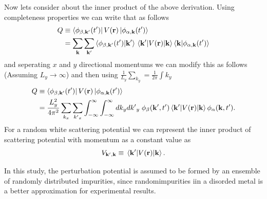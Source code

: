 \noindent
Now lets consider about the inner product of the above derivation. Using completeness properties we can write that as follows
\begin{equation} \label{4.23}
  \begin{aligned}
    Q & \equiv
    \bra{\phi_{\beta,\mathbf{k'}}(t')}
    V(\mathbf{r}) \ket{\phi_{\alpha,\mathbf{k}}(t')} \\
    & =
    \sum_{\mathbf{k}}\sum_{\mathbf{k'}}
    \braket{\phi_{\beta,\mathbf{k'}}(t')}{\mathbf{k'}}
    \mel{\mathbf{k'}}{V(\mathbf{r})}{\mathbf{k}}
    \braket{\mathbf{k}}{\phi_{\alpha,\mathbf{k}}(t')}
  \end{aligned}
\end{equation}
and seperating $x$ and $y$ directional momentums we can modify this as follows (Assuming $L_y \rightarrow \infty$) and then using $\frac{1}{L_y}\sum_{k_y} = \frac{1}{2\pi}\int k_y$
\begin{equation} \label{4.24}
  \begin{aligned}
    Q & \equiv
    \bra{\phi_{\beta,\mathbf{k'}}(t')}
    V(\mathbf{r}) \ket{\phi_{\alpha,\mathbf{k}}(t')} \\
    & =
    \frac{L_y^2}{4 \pi^2}
    \sum_{k_x}\sum_{{k'}_x}
    \int_{-\infty}^{\infty} \int_{-\infty}^{\infty} dk_y d{k'}_y \;
    \phi_{\beta}(\mathbf{k'},t')
    \mel{\mathbf{k'}}{V(\mathbf{r})}{\mathbf{k}}
    \phi_{\alpha}(\mathbf{k},t').
  \end{aligned}
\end{equation}
For a random white scattering potential we can represent the inner product of scattering potential with momentum as a constant value as
\begin{equation} \label{4.25}
  V_{\mathbf{k'},\mathbf{k}} \equiv \mel{\mathbf{k'}}{V(\mathbf{r})}{\mathbf{k}}.
\end{equation}

\noindent
In this study, the perturbation potential is assumed to be formed by an ensemble of randomly distributed impurities, since randomimpurities iin a disorded metal is a better approximation for experimental results.

